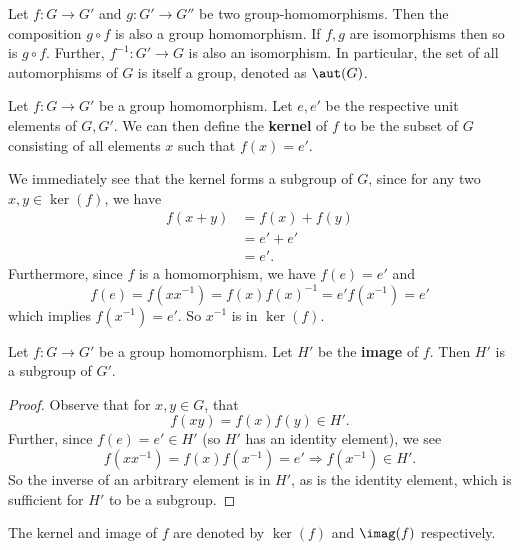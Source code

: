 Let $f:G\to G'$ and $g:G'\to G''$ be two
group-homomorphisms. Then the composition $g\circ f$ is also
a group homomorphism. If $f,g$ are isomorphisms then so is
$g\circ f$. Further, $f^{-1}:G'\to G$ is also an
isomorphism. In particular, the set of all automorphisms of
$G$ is itself a group, denoted as $\aut(G)$.
\begin{defn}
Let $f:G\to G'$ be a group homomorphism. Let $e,e'$ be the
respective unit elements of $G,G'$. We can then define the
\textbf{kernel} of $f$ to
be the subset of $G$ consisting of all elements $x$ such
that $f(x)=e'$.
\end{defn}
We immediately see that the kernel forms a subgroup of $G$,
since for any two $x,y\in\ker(f)$, we have
\begin{align*}
f(x+y) &= f(x)+f(y)\\
&= e'+e'\\
&= e'.
\end{align*}
Furthermore, since $f$ is a homomorphism, we have $f(e)=e'$
and
\begin{equation}
f(e) = f(xx^{-1}) = f(x)f(x)^{-1} = e'f(x^{-1})=e'
\end{equation}
which implies $f(x^{-1})=e'$. So $x^{-1}$ is in $\ker(f)$.
\begin{prop}
Let $f:G\to G'$ be a group homomorphism. Let $H'$ be the
\textbf{image} of $f$. Then $H'$
is a subgroup of $G'$.
\end{prop}
\begin{proof}
Observe that for $x,y\in G$, that
\begin{equation}
f(xy)=f(x)f(y)\in H'.
\end{equation}
Further, since $f(e)=e'\in H'$ (so $H'$ has an identity
element), we see
\begin{equation}
f(xx^{-1})=f(x)f(x^{-1})=e'\Rightarrow f(x^{-1})\in H'.
\end{equation}
So the inverse of an arbitrary element is in $H'$, as is the
identity element, which is sufficient for $H'$ to be a
subgroup. 
\end{proof}
\begin{rmk}
The kernel and image of $f$ are denoted by $\ker(f)$ and
$\imag(f)$ respectively.
\end{rmk}
